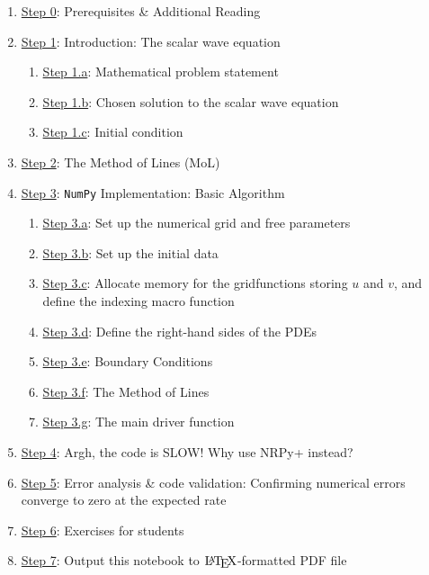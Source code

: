 \documentclass[landscape,letterpaper,10pt,english]{article}
\providecommand{\tightlist}{%
      \setlength{\itemsep}{0pt}\setlength{\parskip}{0pt}}
\let\Oldlatex\LaTeX
\renewcommand{\LaTeX}{\textrm{\Oldlatex}}
\begin{document}
\begin{enumerate}
\def\labelenumi{\arabic{enumi}.}
\tightlist
\item
  \hyperref[prereqs]{Step 0}: Prerequisites \& Additional Reading
\item
  \hyperref[intro]{Step 1}: Introduction: The scalar wave equation

  \begin{enumerate}
  \def\labelenumii{\arabic{enumii}.}
  \tightlist
  \item
    \hyperref[problem_statement]{Step 1.a}: Mathematical problem
    statement
  \item
    \hyperref[solution]{Step 1.b}: Chosen solution to the scalar wave
    equation
  \item
    \hyperref[initial_condition]{Step 1.c}: Initial condition
  \end{enumerate}
\item
  \hyperref[mol]{Step 2}: The Method of Lines (MoL)
\item
  \hyperref[basicalg]{Step 3}: \texttt{NumPy} Implementation: Basic
  Algorithm

  \begin{enumerate}
  \def\labelenumii{\arabic{enumii}.}
  \tightlist
  \item
    \hyperref[numgrid_freeparams]{Step 3.a}: Set up the numerical grid
    and free parameters
  \item
    \hyperref[numpy_id]{Step 3.b}: Set up the initial data
  \item
    \hyperref[numpy_gfs]{Step 3.c}: Allocate memory for the
    gridfunctions storing \(u\) and \(v\), and define the indexing macro
    function
  \item
    \hyperref[numpy_rhss]{Step 3.d}: Define the right-hand sides of the
    PDEs
  \item
    \hyperref[numpy_bcs]{Step 3.e}: Boundary Conditions
  \item
    \hyperref[numpy_mol]{Step 3.f}: The Method of Lines
  \item
    \hyperref[numpy_driver]{Step 3.g}: The main driver function
  \end{enumerate}
\item
  \hyperref[too_slow]{Step 4}: Argh, the code is SLOW! Why use NRPy+
  instead?
\item
  \hyperref[error_analysis]{Step 5}: Error analysis \& code validation:
  Confirming numerical errors converge to zero at the expected rate
\item
  \hyperref[student_exercises]{Step 6}: Exercises for students
\item
  \hyperref[latex_pdf_output]{Step 7}: Output this notebook to
  \(\LaTeX\)-formatted PDF file
\end{enumerate}
\end{document}
